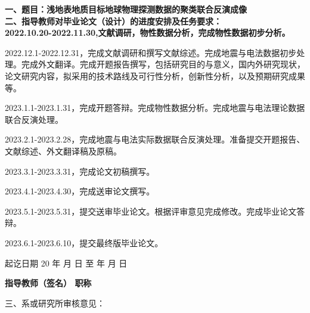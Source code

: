 \cleardoublepage{}

{
    \bfseries
    \noindent 一、题目：浅地表地质目标地球物理探测数据的聚类联合反演成像\\
    \noindent 二、指导教师对毕业论文（设计）的进度安排及任务要求：\\

    2022.10.20-2022.11.30,文献调研，物性数据分析，完成物性数据初步分析。

2022.12.1-2022.12.31，完成文献调研和撰写文献综述。完成地震与电法数据初步处理。完成外文翻译。完成开题报告撰写，包括研究目的与意义，国内外研究现状，论文研究内容，拟采用的技术路线及可行性分析，创新性分析，以及预期研究成果等。

2023.1.1-2023.1.31，完成开题答辩。完成物性数据分析。完成地震与电法理论数据联合反演处理。

2023.2.1-2023.2.28，完成地震与电法实际数据联合反演处理。准备提交开题报告、文献综述、外文翻译稿及原稿。

2023.3.1-2023.3.31，完成论文初稿撰写。

2023.4.1-2023.4.30，完成送审论文撰写。

2023.5.1-2023.5.31，提交送审毕业论文。根据评审意见完成修改。完成毕业论文答辩。

2023.6.1-2023.6.10，提交最终版毕业论文。
    \vskip 20mm

    \noindent 起讫日期 20 \quad 年 \quad  月 \quad  日 \quad 至  \quad  年 \quad  月  \quad 日
    \begin{flushright}
        \bfseries {}
            指导教师（签名） \underline{} 职称 \underline{}
    \end{flushright}

    \noindent 三、系或研究所审核意见：\\

    \mbox{} \vfill
    \signature{负责人（签名）}
}
